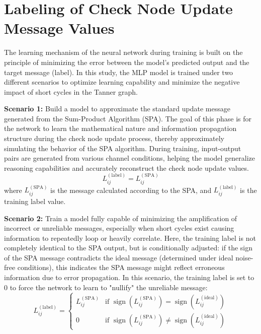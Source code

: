 \documentclass[a4paper,14pt]{extreport}
\begin{document}
\section{Labeling of Check Node Update Message Values}

The learning mechanism of the neural network during training is built on the principle of minimizing the error between the model's predicted output and the target message (label). In this study, the MLP model is trained under two different scenarios to optimize learning capability and minimize the negative impact of short cycles in the Tanner graph.

\textbf{Scenario 1:} Build a model to approximate the standard update message generated from the Sum-Product Algorithm (SPA). The goal of this phase is for the network to learn the mathematical nature and information propagation structure during the check node update process, thereby approximately simulating the behavior of the SPA algorithm. During training, input-output pairs are generated from various channel conditions, helping the model generalize reasoning capabilities and accurately reconstruct the check node update values.
\begin{equation}
    L_{ij}^{(\text{label})} = L_{ij}^{(\text{SPA})}
    \label{eq:label_scenario1}
\end{equation}
where $L_{ij}^{(\text{SPA})}$ is the message calculated according to the SPA, and $L_{ij}^{(\text{label})}$ is the training label value.

\textbf{Scenario 2:} Train a model fully capable of minimizing the amplification of incorrect or unreliable messages, especially when short cycles exist causing information to repeatedly loop or heavily correlate. Here, the training label is not completely identical to the SPA output, but is conditionally adjusted: if the sign of the SPA message contradicts the ideal message (determined under ideal noise-free conditions), this indicates the SPA message might reflect erroneous information due to error propagation. In this scenario, the training label is set to 0 to force the network to learn to "nullify" the unreliable message:
\begin{equation}
    L_{ij}^{(\text{label})} = 
    \begin{cases}
        L_{ij}^{(\text{SPA})} & \text{if } \operatorname{sign}\left(L_{ij}^{(\text{SPA})}\right) = \operatorname{sign}\left(L_{ij}^{(\text{ideal})}\right) \\
        0 & \text{if } \operatorname{sign}\left(L_{ij}^{(\text{SPA})}\right) \neq \operatorname{sign}\left(L_{ij}^{(\text{ideal})}\right)
    \end{cases}
    \label{eq:label_scenario2}
\end{equation}
\end{document}
